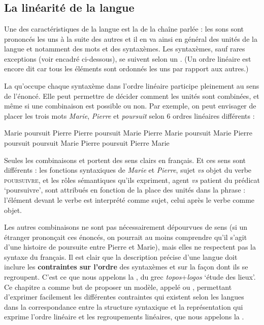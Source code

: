 \chapter{}\label{sec:3.5}

\section{La linéarité de la langue}\label{sec:3.5.0}

Une des caractéristiques de la langue est la  de la chaîne parlée : les sons sont prononcés les uns à la suite des autres et il en va ainsi en général des unités de la langue et notamment des mots et des syntaxèmes. Les syntaxèmes, sauf rares exceptions (voir encadré ci-dessous), se suivent selon un . (Un ordre linéaire est encore dit  car tous les éléments sont ordonnés les uns par rapport aux autres.)

La  qu’occupe chaque syntaxème dans l’ordre linéaire participe pleinement au sens de l’énoncé. Elle peut permettre de décider comment les unités sont combinées, et même si une combinaison est possible ou non. Par exemple, on peut envisager de placer les trois mots \textit{Marie}, \textit{Pierre} et \textit{poursuit} selon 6 ordres linéaires différents :

\ea
\ea Marie poursuit Pierre
\ex Pierre poursuit Marie
\ex Pierre Marie poursuit
\ex Marie Pierre poursuit
\ex poursuit Marie Pierre
\ex poursuit Pierre Marie
\z
\z

Seules les combinaisons  et  portent des sens clairs en français. Et ces sens sont différents : les fonctions syntaxiques de \textit{Marie} et \textit{Pierre}, sujet \textit{vs} objet du verbe \textsc{poursuivre}, et les rôles sémantiques qu’ils expriment, agent \textit{vs} patient du prédicat ‘poursuivre’, sont attribués en fonction de la place des unités dans la phrase : l’élément devant le verbe est interprété comme sujet, celui après le verbe comme objet.

Les autres combinaisons ne sont pas nécessairement dépourvues de sens (si un étranger prononçait ces énoncés, on pourrait au moins comprendre qu’il s’agit d’une histoire de poursuite entre Pierre et Marie), mais elles ne respectent pas la syntaxe du français. Il est clair que la description précise d’une langue doit inclure les \textbf{contraintes sur l’ordre} des syntaxèmes et sur la façon dont ils se regroupent. C’est ce que nous appelons la , du grec \textit{topos}+\textit{logos} ‘étude des lieux’. Ce chapitre a comme but de proposer un modèle, appelé  ou , permettant d’exprimer facilement les différentes contraintes qui existent selon les langues dans la correspondance entre la structure syntaxique et la représentation qui exprime l’ordre linéaire et les regroupements linéaires, que nous appelons la .

